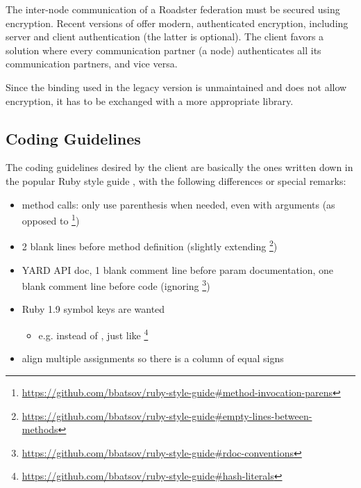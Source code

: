 The inter-node communication of a Roadster federation must be secured using
encryption. Recent versions of \zmq offer modern, authenticated encryption,
including server and client authentication (the latter is optional).
The client favors a solution where every communication partner (a node)
authenticates all its communication partners, and vice versa.

Since the \zmq binding used in the legacy version is unmaintained and does not
allow encryption, it has to be exchanged with a more appropriate library.

\subsection{Coding Guidelines}
The coding guidelines desired by the client are basically the ones written down
in the popular Ruby style guide \cite{rb:style-guide}, with the following
differences or special remarks:

\begin{itemize}
	\item method calls: only use parenthesis when needed, even with
		arguments (as opposed to
		\footnote{\url{https://github.com/bbatsov/ruby-style-guide\#method-invocation-parens}})
	\item 2 blank lines before method definition (slightly extending
		\footnote{\url{https://github.com/bbatsov/ruby-style-guide\#empty-lines-between-methods}})
	\item YARD API doc, 1 blank comment line before param documentation,
		one blank comment line before code (ignoring
		\footnote{\url{https://github.com/bbatsov/ruby-style-guide\#rdoc-conventions}})
	\item Ruby 1.9 symbol keys are wanted
		\begin{itemize}
			\item e.g.  instead of , just like
			\footnote{\url{https://github.com/bbatsov/ruby-style-guide\#hash-literals}}
		\end{itemize}
	\item align multiple assignments so there is a column of equal signs
\end{itemize}
